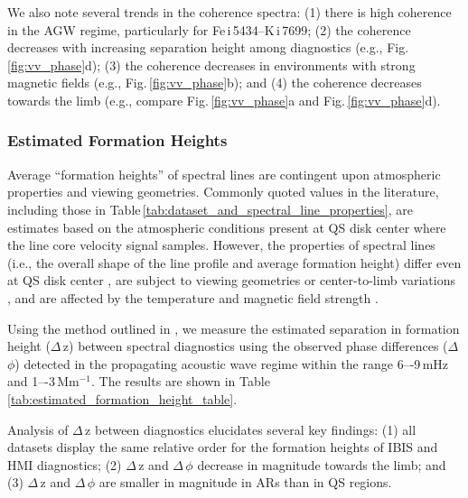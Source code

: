 \documentclass[preprint2,linenumbers]{aastex701}
\newcommand{\IBISFeUpperPhot}[1]{Fe\,{\sc i}\,5434}
\newcommand{\IBISK}[1]{K\,{\sc i}\,7699}
\begin{document}
We also note several trends in the coherence spectra: (1) there is high coherence in the AGW regime, particularly for \IBISFeUpperPhot{}--\IBISK{}; (2) the coherence decreases with increasing separation height among diagnostics (e.g., Fig.\,\ref{fig:vv_phase}d); (3) the coherence decreases in environments with strong magnetic fields (e.g., Fig.\,\ref{fig:vv_phase}b); and (4) the coherence decreases towards the limb (e.g., compare Fig.\,\ref{fig:vv_phase}a and Fig.\,\ref{fig:vv_phase}d).

\subsubsection{Estimated Formation Heights}  \label{subsubsec:estimated_formation_heights}


Average ``formation heights'' of spectral lines are contingent upon atmospheric properties and viewing geometries.
Commonly quoted values in the literature, including those in Table\,\ref{tab:dataset_and_spectral_line_properties}, are estimates based on the atmospheric conditions present at QS disk center where the line core velocity signal samples.
However, the properties of spectral lines (i.e., the overall shape of the line profile and average formation height) differ even at QS disk center \citep[for instance, granular vs. intergranular regimes;][]{2001_Shchukina_TrujilloBueno, 2011_kneer_Bello}, are subject to viewing geometries or center-to-limb variations \citep[e.g.,][]{1975_Altrock_November_Simon_etal, 2019_LohnerBottcher_Schmidt_Schlichenmaier_etal}, and are affected by the temperature and magnetic field strength \citep[i.e., flares, ARs, sunspot umbra;][]{2006_Norton_Graham_Ulrich_etal, 2017_QuinteroNoda, 2020_Kuridze_Mathioudakis_Heinzel_etal}.

Using the method outlined in , we measure the estimated separation in formation height ($\Delta$\,z) between spectral diagnostics using the observed phase differences ($\Delta$\,$\phi$) detected in the propagating acoustic wave regime within the range 6–-9\,mHz and 1–-3\,Mm$^{-1}$.
The results are shown in Table\,\ref{tab:estimated_formation_height_table}.

Analysis of $\Delta$\,z between diagnostics elucidates several key findings: (1) all datasets display the same relative order for the formation heights of IBIS and HMI diagnostics; (2) $\Delta$\,z and $\Delta$\,$\phi$ decrease in magnitude towards the limb; and (3) $\Delta$\,z and $\Delta$\,$\phi$ are smaller in magnitude in ARs than in QS regions.
\end{document}
